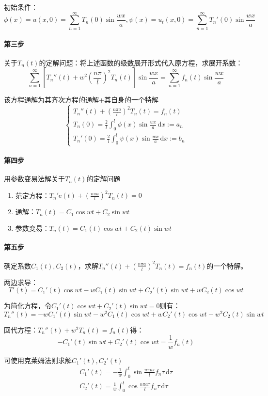 初始条件：
\[
\phi(x)=u(x,0)=\sum_{n=1}^{\infty} T_n(0)\sin{\frac{wx}{a}},\psi(x)=u_t(x,0)=\sum_{n=1}^{\infty} T_n'(0)\sin{\frac{wx}{a}}
\]

\paragraph{第三步}关于\(T_n(t)\)的定解问题：将上述函数的级数展开形式代入原方程，求展开系数：
\[
\sum_{n=1}^{\infty}{\left[T_n''(t)+w^2\left(\frac{n\pi}{l}\right)^2T_n(t)\right]\sin{\frac{wx}{a}}}=\sum_{n=1}^{\infty}{f_n(t)\sin{\frac{wx}{a}}}
\]

该方程通解为其齐次方程的通解+其自身的一个特解
\[\begin{cases}
T_n''(t)+\left(\frac{n\pi a}{l}\right)^2T_n(t)=f_n(t)\\T_n(0)=\frac{2}{l}\int_{0}^{l}\phi(x)\sin{\frac{wx}{a}\,\mathrm{d}x}:=a_n\\T_n'(0)=\frac{2}{l}\int_{0}^{l}\psi(x)\sin{\frac{wx}{a}\,\mathrm{d}x}:=b_n
\end{cases}\]

\paragraph{第四步}用参数变易法解关于\(T_n(t)\)的定解问题
\begin{enumerate}
	\item 范定方程：\(T_n'\mathrm{e}(t)+\left(\frac{n\pi a}{l}\right)^2T_n(t)=0\)
	\item 通解：\(T_n(t)=C_1\cos w t+C_2\sin w t\)
	\item 参数变易：\(T_n(t)=C_1(t)\cos w t+C_2(t)\sin w t\)
\end{enumerate}

\paragraph{第五步}确定系数\(C_1(t),C_2(t)\)，求解\(T_n''(t)+\left(\frac{n\pi a}{l}\right)^2T_n(t)=f_n(t)\)的一个特解。

两边求导：
\[
T'(t)=C_1'(t)\cos w t-w C_1(t)\sin w t+C_2'(t)\sin w t+ w C_2(t)\cos w t
\]

为简化方程，令\(C_1'(t)\cos w t+C_2'(t)\sin w t=0\)则有：
\[
T_n''(t)=-w C_1'(t)\sin w t-w^2C_1(t)\cos{w t}+ w C_2'(t)\cos{w t}-w^2C_2(t)\sin{w t}
\]

回代方程：\(T_n''(t)+ w^2T_n(t)=f_n(t)\)得：
\[
-C_1'(t)\sin{w t}+C_2'(t)\cos{w t}=\frac{1}{w}f_n(t)
\]

可使用克莱姆法则求解\(C_1'(t),C_2'(t)\)
\begin{gather*}
C_1'(t)=-\frac{1}{w}\int_{0}^{t}\sin{\frac{n\pi a\tau}{l}f_n\tau}\,\mathrm{d}\tau\\
C_2'(t)=\frac{1}{w}\int_{0}^{t}\cos{\frac{n\pi a\tau}{l}f_n\tau}\,\mathrm{d}\tau
\end{gather*}


